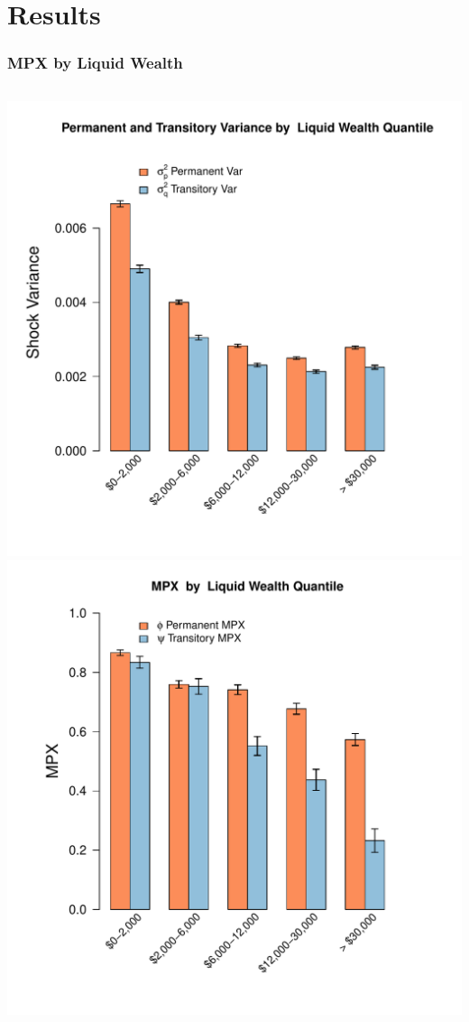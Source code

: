 \documentclass{beamer}
\begin{document}
\section{Results}
\frame
{
	\frametitle{MPX by Liquid Wealth}
	\begin{columns}
		\centering
		\includegraphics[scale=0.35]{../Figures/VarianceByLiquidWealth_level_lincome_head.pdf}
		\centering
		\includegraphics[scale=0.35]{../Figures/MPXByLiquidWealth_level_lincome_head.pdf}
	\end{columns} 	
}
\end{document}
